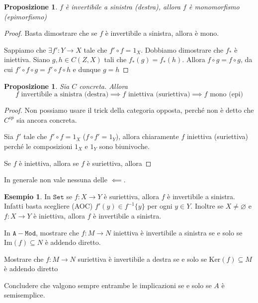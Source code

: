 \documentclass[notitlepage]{report}
\newcounter{theo}[section]\setcounter{theo}{0}
\newcounter{excounter}[section]\setcounter{excounter}{0}
\numberwithin{equation}{section}
\theoremstyle{plain}
\newtheorem{proposition}[theo]{Proposizione}
\theoremstyle{definition}
\newtheorem{example}[excounter]{Esempio}
\theoremstyle{remark}
\begin{document}
\begin{proposition}{}
    \(f\) è invertibile a sinistra (destra), allora \(f\) è monomorfismo
    (epimorfismo)
\end{proposition}
\begin{proof}{}
    Basta dimostrare che se \(f\) è invertibile a sinistra, allora è mono.

    Sappiamo che \(\exists f' : Y\to X\) tale che \(f' \circ f = 1_X\). Dobbiamo
    dimostrare che \(f_*\) è iniettiva. Siano \(g, h \in C{(Z, X)}\) tali che \(f_*{(g)} = f_*{(h)}\). Allora \(f \circ g = f \circ g\), da cui \(f' \circ f \circ g = f' \circ f \circ h\) e dunque \(g = h\) 
\end{proof}

\begin{proposition}{}
    Sia \(C\) concreta. Allora
    \[
      f \text{ invertibile a sinistra (destra)} \implies f \text{ iniettiva
      (suriettiva)} \implies f \text{ mono (epi)}
    \]
\end{proposition}
\begin{proof}{}
    Non possiamo usare il trick della categoria opposta, perché non è detto che
    \(C^{op}\) sia ancora concreta.

    Sia \(f'\) tale che \(f' \circ f = 1_X\) (\(f \circ f' = 1_Y\)), allora
    chiaramente \(f\) iniettiva (suriettiva) perché le composizioni \(1_X\) e \(1_Y\) sono biunivoche.

    Se \(f\) è iniettiva, allora %
    se \(f\) è suriettiva, allora %
\end{proof}

In generale non vale nessuna delle \(\impliedby\).
\begin{example}{}
    In \(\mathtt{Set}\) se \(f : X \to Y\) è suriettiva, allora \(f\) è invertibile a
    sinistra. Infatti basta scegliere (AOC) \(f'{(y)} \in f^{-1}\{y\} \) per
    ogni \(y \in Y\). Inoltre se \(X \neq \varnothing\) e \(f : X \to Y\) è
    iniettiva, allora \(f\) è invertibile a sinistra.
\end{example}

\begin{eser}{}
    In \(\mathtt{A-Mod}\), mostrare che \(f : M\to N\) iniettiva è invertibile a
    sinistra se e solo se \(\mathrm{Im}{(f)} \subseteq N \) è addendo diretto.

    Mostrare che \(f : M \to N\) suriettiva è invertibile a destra se e solo se
    \(\mathrm{Ker}{(f)} \subseteq M \) è addendo diretto

    Concludere che valgono sempre entrambe le implicazioni se e solo se \(A\) è
    semisemplice.
\end{eser}
\end{document}
